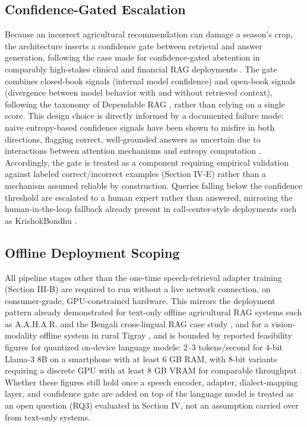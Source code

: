 \documentclass[conference]{IEEEtran}
\begin{document}
\subsection{Confidence-Gated Escalation}
Because an incorrect agricultural recommendation can damage a season's crop, the architecture inserts a confidence gate between retrieval and answer generation, following the case made for confidence-gated abstention in comparably high-stakes clinical and financial RAG deployments \cite{abstinence2025}. The gate combines closed-book signals (internal model confidence) and open-book signals (divergence between model behavior with and without retrieved context), following the taxonomy of Dependable RAG \cite{dependablerag2026}, rather than relying on a single score. This design choice is directly informed by a documented failure mode: naive entropy-based confidence signals have been shown to misfire in both directions, flagging correct, well-grounded answers as uncertain due to interactions between attention mechanisms and entropy computation \cite{intrygue2026}. Accordingly, the gate is treated as a component requiring empirical validation against labeled correct/incorrect examples (Section IV-E) rather than a mechanism assumed reliable by construction. Queries falling below the confidence threshold are escalated to a human expert rather than answered, mirroring the human-in-the-loop fallback already present in call-center-style deployments such as KrishokBondhu \cite{ameen2026krishokbondhu}.

\subsection{Offline Deployment Scoping}
All pipeline stages other than the one-time speech-retrieval adapter training (Section III-B) are required to run without a live network connection, on consumer-grade, GPU-constrained hardware. This mirrors the deployment pattern already demonstrated for text-only offline agricultural RAG systems such as A.A.H.A.R. \cite{dubey2025aahar} and the Bengali cross-lingual RAG case study \cite{hossain2026bengalirag}, and for a vision-modality offline system in rural Tigray \cite{tigray2025plantdisease}, and is bounded by reported feasibility figures for quantized on-device language models: 2--3 tokens/second for 4-bit Llama-3 8B on a smartphone with at least 6 GB RAM, with 8-bit variants requiring a discrete GPU with at least 8 GB VRAM for comparable throughput \cite{compactllm2026}. Whether these figures still hold once a speech encoder, adapter, dialect-mapping layer, and confidence gate are added on top of the language model is treated as an open question (RQ3) evaluated in Section IV, not an assumption carried over from text-only systems.
\end{document}
